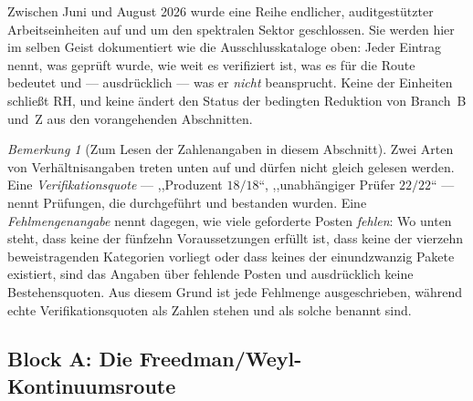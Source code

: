 \documentclass[12pt,a4paper]{article}
\theoremstyle{definition}
\theoremstyle{remark}
\newtheorem{remark}[theorem]{Bemerkung}
\begin{document}
Zwischen Juni und August 2026 wurde eine Reihe endlicher, auditgestützter
Arbeitseinheiten auf und um den spektralen Sektor geschlossen. Sie werden
hier im selben Geist dokumentiert wie die Ausschlusskataloge oben: Jeder
Eintrag nennt, was geprüft wurde, wie weit es verifiziert ist, was es für
die Route bedeutet und --- ausdrücklich --- was er \emph{nicht}
beansprucht. Keine der Einheiten schließt RH, und keine ändert den Status
der bedingten Reduktion von Branch~B und~Z aus den vorangehenden
Abschnitten.

\begin{remark}[Zum Lesen der Zahlenangaben in diesem Abschnitt]
\label{rem:v32-counts}
Zwei Arten von Verhältnisangaben treten unten auf und dürfen nicht gleich
gelesen werden. Eine \emph{Verifikationsquote} --- ,,Produzent $18/18$``,
,,unabhängiger Prüfer $22/22$`` --- nennt Prüfungen, die durchgeführt und
bestanden wurden. Eine \emph{Fehlmengenangabe} nennt dagegen, wie viele
geforderte Posten \emph{fehlen}: Wo unten steht, dass keine der fünfzehn
Voraussetzungen erfüllt ist, dass keine der vierzehn beweistragenden
Kategorien vorliegt oder dass keines der einundzwanzig Pakete existiert,
sind das Angaben über fehlende Posten und ausdrücklich keine
Bestehensquoten. Aus diesem Grund ist jede Fehlmenge ausgeschrieben,
während echte Verifikationsquoten als Zahlen stehen und als solche benannt
sind.
\end{remark}

\subsection{Block A: Die Freedman/Weyl-Kontinuumsroute}
\label{sec:v32-block-a}
\end{document}
